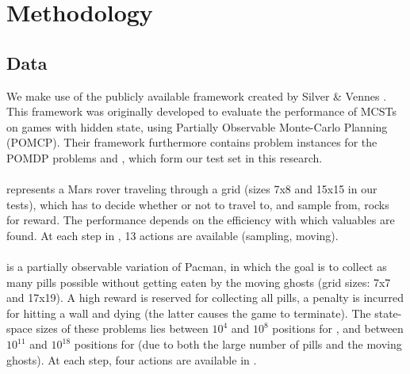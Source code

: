 
\section{Methodology}

\subsection{Data}
We make use of the publicly available framework created by Silver \& Vennes \cite{silver2010monte}. This framework was originally developed to evaluate the performance of MCSTs on games with hidden state, using Partially Observable Monte-Carlo Planning (POMCP). Their framework furthermore contains problem instances for  the POMDP problems \rock and \poc, which form our test set in this research. \\ \\
\rock represents a Mars rover traveling through a grid (sizes 7x8 and 15x15 in our tests), which has to decide whether or not to travel to, and sample from, rocks for reward. The performance depends on the efficiency with which valuables are found. At each step in \rock, 13 actions are available (\eg sampling, moving). \\ \\
\poc is a partially observable variation of Pacman, in which the goal is to collect as many pills possible without getting eaten by the moving ghosts (grid sizes: 7x7 and 17x19). A high reward is reserved for collecting all pills, a penalty is incurred for hitting a wall and dying (the latter causes the game to terminate). The state-space sizes of these problems lies between $10^4$ and $10^8$ positions for \rock, and between $10^{11}$ and $10^{18}$ positions for \poc (due to both the large number of pills and the moving ghosts). At each step, four actions are available in \poc.
